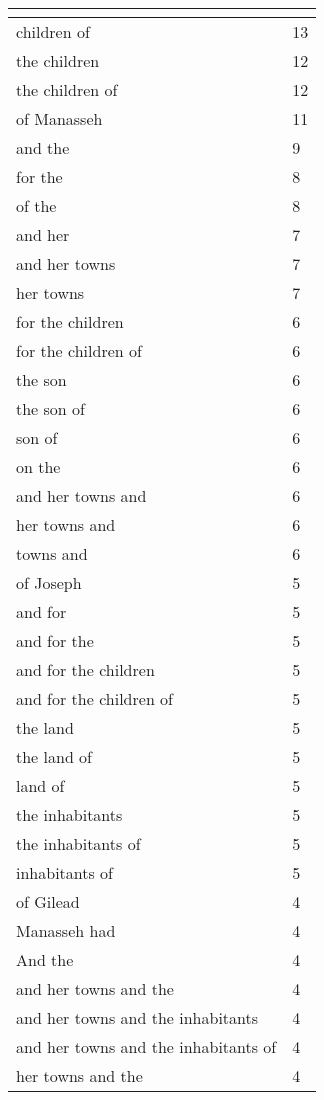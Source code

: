 \begin{center}
\begin{longtable}{|p{3.0in}|p{0.5in}|}
\hline \multicolumn{2}{c}{{ }} \\ \hline
\endfoot 
children of & 13\\ \hline 
the children & 12\\ \hline 
the children of & 12\\ \hline 
of Manasseh & 11\\ \hline 
and the & 9\\ \hline 
for the & 8\\ \hline 
of the & 8\\ \hline 
and her & 7\\ \hline 
and her towns & 7\\ \hline 
her towns & 7\\ \hline 
for the children & 6\\ \hline 
for the children of & 6\\ \hline 
the son & 6\\ \hline 
the son of & 6\\ \hline 
son of & 6\\ \hline 
on the & 6\\ \hline 
and her towns and & 6\\ \hline 
her towns and & 6\\ \hline 
towns and & 6\\ \hline 
of Joseph & 5\\ \hline 
and for & 5\\ \hline 
and for the & 5\\ \hline 
and for the children & 5\\ \hline 
and for the children of & 5\\ \hline 
the land & 5\\ \hline 
the land of & 5\\ \hline 
land of & 5\\ \hline 
the inhabitants & 5\\ \hline 
the inhabitants of & 5\\ \hline 
inhabitants of & 5\\ \hline 
of Gilead & 4\\ \hline 
Manasseh had & 4\\ \hline 
And the & 4\\ \hline 
and her towns and the & 4\\ \hline 
and her towns and the inhabitants & 4\\ \hline 
and her towns and the inhabitants of & 4\\ \hline 
her towns and the & 4\\ \hline 

\end{longtable}
\end{center}

